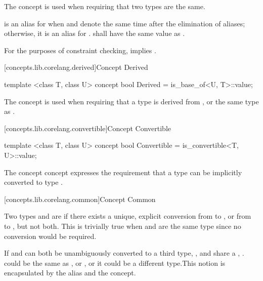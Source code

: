 \begin{addedblock}
\begin{itemdescr}
\pnum
The  concept is used when requiring that two types are the same.

\pnum
{} is an alias for  when  and 
denote the same time after the elimination of aliases; otherwise, it is an alias for
.  shall have the same value as
.

\pnum
\remarks For the purposes of constraint checking,  implies
.
\end{itemdescr}

[concepts.lib.corelang.derived]{Concept Derived}

%
\begin{itemdecl}
template <class T, class U>
concept bool Derived = is_base_of<U, T>::value;
\end{itemdecl}

\begin{itemdescr}
\pnum
The  concept is used when requiring that a type  is derived
from , or the same type as .
\end{itemdescr}

[concepts.lib.corelang.convertible]{Concept Convertible}

%
\begin{itemdecl}
template <class T, class U>
concept bool Convertible = is_convertible<T, U>::value;
\end{itemdecl}

\begin{itemdescr}
\pnum
The  concept concept expresses the requirement that a type
 can be implicitly converted to type .
\end{itemdescr}

[concepts.lib.corelang.common]{Concept Common}

\pnum
Two types  and  are  if
there exists a unique, explicit conversion from  to , or from
 to , but not both. \enternote This is trivially true
when  and  are the same type since no conversion would be
required.\exitnote

\pnum
If  and  can both be unambiguously converted to a third type,
,  and  share a ,
. \enternote {} could be the same as , or , or
it could be a different type.\exitnote This notion is encapsulated by the
 alias and the  concept.


\end{addedblock}
